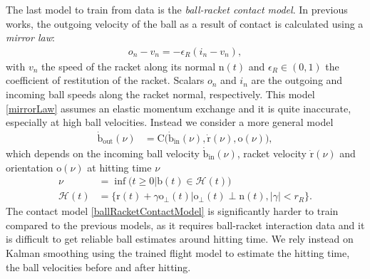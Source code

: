 \documentclass[letterpaper, 10 pt, conference]{ieeeconf}
\newcommand{\boldvec}[1]{\boldsymbol{\mathrm{#1}}}
\let\vec\boldvec
\newcommand{\ball}{\vec{b}} %
\newcommand{\contact}{\vec{C}} %
\newcommand{\racket}{\vec{r}} %
\newcommand{\racketRadius}{r_R} %
\newcommand{\orient}{\vec{o}} %
\newcommand{\normal}{\vec{n}} %
\newcommand{\prob}{\mathbb{P}} %
\newcommand{\hitTime}{\nu} %
\newcommand{\hitEvent}{\mathcal{H}}
\newcommand{\hitDist}{p(\nu)} %
\begin{document}


The last model to train from data is the \emph{ball-racket contact model}. In previous works, the outgoing velocity of the ball as a result of contact is calculated using a \emph{mirror law}: 
%
\begin{align}
o_{n} - v_{n} = -\epsilon_{R} (i_{n} - v_{n}),
\label{mirrorLaw}
\end{align}
%
\noindent with $v_{n}$ the speed of the racket along its normal $\normal(t)$ and $\epsilon_{R} \in (0,1)$ the coefficient of restitution of the racket. Scalars $o_{n}$ and $i_{n}$ are the outgoing and incoming ball speeds along the racket normal, respectively. This model \eqref{mirrorLaw} assumes an elastic momentum exchange and it is quite inaccurate, especially at high ball velocities. Instead we consider a more general model
%
\begin{align}
\dot{\ball}_{\mathrm{out}}(\hitTime) &= \contact\big(\dot{\ball}_{\mathrm{in}}(\hitTime),\dot{\racket}(\hitTime),\orient(\hitTime)\big),
\label{ballRacketContactModel}
\end{align}
%
\noindent which depends on the incoming ball velocity $\dot{\ball}_{\mathrm{in}}(\hitTime)$, racket velocity $\dot{\racket}(\hitTime)$ and orientation $\orient(\hitTime)$ at hitting time $\hitTime$ 
%
\begin{align}
\hitTime &= \inf\big(t \geq 0 | \ball(t) \in \hitEvent(t)\big) \label{hitTime} \\
\hitEvent(t) &= \{\racket(t) + \gamma \orient_{\perp}(t) | \orient_{\perp}(t) \perp \normal(t), |\gamma| < \racketRadius\}. \label{hitEvent}
\end{align}
%
\noindent The contact model \eqref{ballRacketContactModel} is significantly harder to train compared to the previous models, as it requires ball-racket interaction data and it is difficult to get reliable ball estimates around hitting time. We rely instead on Kalman smoothing using the trained flight model to estimate the hitting time, the ball velocities before and after hitting. 
\end{document}
